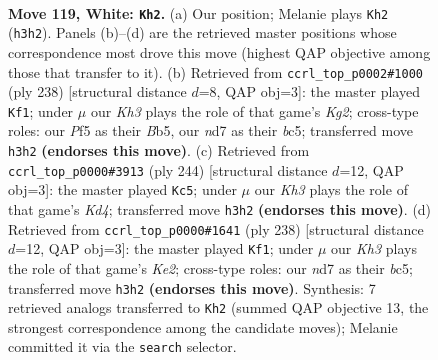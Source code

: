 \documentclass[11pt]{article}
\begin{document}
\clearpage

\begin{figure}[p]\centering
\begin{subfigure}{0.46\textwidth}\centering
\resizebox{\linewidth}{!}{%
\newchessgame
\chessboard[
  setfen={7k/3n4/8/5P2/p6P/P6K/5B2/8 w - - 5 119},
  showmover=false,
  pgfstyle=straightmove, color=movearrow, markmove={h3-h2}
]}
\caption{}
\end{subfigure}\hfill
\begin{subfigure}{0.46\textwidth}\centering
\resizebox{\linewidth}{!}{%
\newchessgame
\chessboard[
  setfen={8/7k/8/1Bb2P1p/7P/6P1/6K1/8 w - - 11 120},
  showmover=false,
  pgfstyle=straightmove, color=movearrow, markmove={g2-f1}
]}
\caption{}
\end{subfigure}
\\[4pt]
\begin{subfigure}{0.46\textwidth}\centering
\resizebox{\linewidth}{!}{%
\newchessgame
\chessboard[
  setfen={4k3/2p5/1n6/3PPB2/3K4/8/8/8 w - - 47 123},
  showmover=false,
  pgfstyle=straightmove, color=movearrow, markmove={d4-c5}
]}
\caption{}
\end{subfigure}\hfill
\begin{subfigure}{0.46\textwidth}\centering
\resizebox{\linewidth}{!}{%
\newchessgame
\chessboard[
  setfen={8/8/5k2/2b3p1/4B3/5PPP/4K3/8 w - - 57 120},
  showmover=false,
  pgfstyle=straightmove, color=movearrow, markmove={e2-f1}
]}
\caption{}
\end{subfigure}
\caption{\textbf{Move 119, White: \texttt{Kh2}.} (a) Our position; Melanie plays \texttt{Kh2} (\texttt{h3h2}). Panels (b)--(d) are the retrieved master positions whose correspondence most drove this move (highest QAP objective among those that transfer to it). (b) Retrieved from \texttt{ccrl\_top\_p0002\#1000} (ply 238) [structural distance $d$=8, QAP obj=3]: the master played \texttt{Kf1}; under $\mu$ our \emph{Kh3} plays the role of that game's \emph{Kg2}; cross-type roles: our \emph{P}f5 as their \emph{B}b5, our \emph{n}d7 as their \emph{b}c5; transferred move \texttt{h3h2} \textbf{(endorses this move)}. (c) Retrieved from \texttt{ccrl\_top\_p0000\#3913} (ply 244) [structural distance $d$=12, QAP obj=3]: the master played \texttt{Kc5}; under $\mu$ our \emph{Kh3} plays the role of that game's \emph{Kd4}; transferred move \texttt{h3h2} \textbf{(endorses this move)}. (d) Retrieved from \texttt{ccrl\_top\_p0000\#1641} (ply 238) [structural distance $d$=12, QAP obj=3]: the master played \texttt{Kf1}; under $\mu$ our \emph{Kh3} plays the role of that game's \emph{Ke2}; cross-type roles: our \emph{n}d7 as their \emph{b}c5; transferred move \texttt{h3h2} \textbf{(endorses this move)}. Synthesis: 7 retrieved analogs transferred to \texttt{Kh2} (summed QAP objective 13, the strongest correspondence among the candidate moves); Melanie committed it via the \texttt{search} selector.}
\label{fig:thought-m236}
\end{figure}
\end{document}
